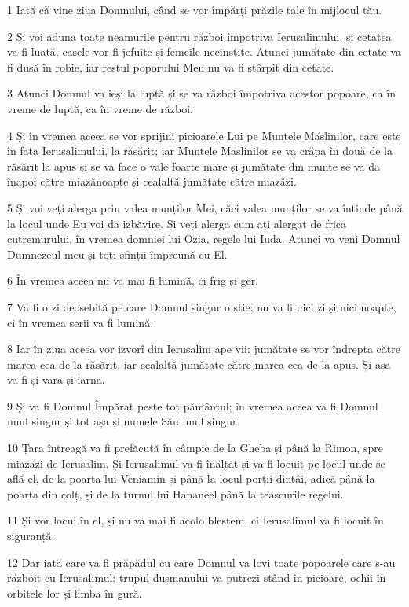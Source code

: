 \par 1 Iată că vine ziua Domnului, când se vor împărți prăzile tale în mijlocul tău.
\par 2 Și voi aduna toate neamurile pentru război împotriva Ierusalimului, și cetatea va fi luată, casele vor fi jefuite și femeile necinstite. Atunci jumătate din cetate va fi dusă în robie, iar restul poporului Meu nu va fi stârpit din cetate.
\par 3 Atunci Domnul va ieși la luptă și se va război împotriva acestor popoare, ca în vreme de luptă, ca în vreme de război.
\par 4 Și în vremea aceea se vor sprijini picioarele Lui pe Muntele Măslinilor, care este în fața Ierusalimului, la răsărit; iar Muntele Măslinilor se va crăpa în două de la răsărit la apus și se va face o vale foarte mare și jumătate din munte se va da înapoi către miazănoapte și cealaltă jumătate către miazăzi.
\par 5 Și voi veți alerga prin valea munților Mei, căci valea munților se va întinde până la locul unde Eu voi da izbăvire. Și veți alerga cum ați alergat de frica cutremurului, în vremea domniei lui Ozia, regele lui Iuda. Atunci va veni Domnul Dumnezeul meu și toți sfinții împreună cu El.
\par 6 În vremea aceea nu va mai fi lumină, ci frig și ger.
\par 7 Va fi o zi deosebită pe care Domnul singur o știe; nu va fi nici zi și nici noapte, ci în vremea serii va fi lumină.
\par 8 Iar în ziua aceea vor izvorî din Ierusalim ape vii: jumătate se vor îndrepta către marea cea de la răsărit, iar cealaltă jumătate către marea cea de la apus. Și așa va fi și vara și iarna.
\par 9 Și va fi Domnul Împărat peste tot pământul; în vremea aceea va fi Domnul unul singur și tot așa și numele Său unul singur.
\par 10 Țara întreagă va fi prefăcută în câmpie de la Gheba și până la Rimon, spre miazăzi de Ierusalim. Și Ierusalimul va fi înălțat și va fi locuit pe locul unde se află el, de la poarta lui Veniamin și până la locul porții dintâi, adică până la poarta din colț, și de la turnul lui Hananeel până la teascurile regelui.
\par 11 Și vor locui în el, și nu va mai fi acolo blestem, ci Ierusalimul va fi locuit în siguranță.
\par 12 Dar iată care va fi prăpădul cu care Domnul va lovi toate popoarele care s-au războit cu Ierusalimul: trupul dușmanului va putrezi stând în picioare, ochii în orbitele lor și limba în gură.
